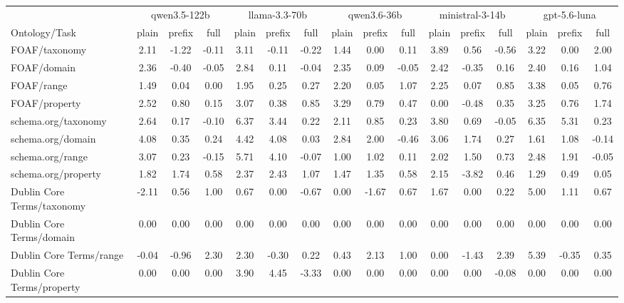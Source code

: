 \begin{tabular}{lccccccccccccccc}
\toprule
 & \multicolumn{3}{c}{qwen3.5-122b} & \multicolumn{3}{c}{llama-3.3-70b} & \multicolumn{3}{c}{qwen3.6-36b} & \multicolumn{3}{c}{ministral-3-14b} & \multicolumn{3}{c}{gpt-5.6-luna} \\
\cmidrule(lr){2-4} \cmidrule(lr){5-7} \cmidrule(lr){8-10} \cmidrule(lr){11-13} \cmidrule(lr){14-16}
Ontology/Task & plain & prefix & full & plain & prefix & full & plain & prefix & full & plain & prefix & full & plain & prefix & full \\
\midrule
FOAF/taxonomy & 2.11 & -1.22 & -0.11 & 3.11 & -0.11 & -0.22 & 1.44 & 0.00 & 0.11 & 3.89 & 0.56 & -0.56 & 3.22 & 0.00 & 2.00 \\
FOAF/domain & 2.36 & -0.40 & -0.05 & 2.84 & 0.11 & -0.04 & 2.35 & 0.09 & -0.05 & 2.42 & -0.35 & 0.16 & 2.40 & 0.16 & 1.04 \\
FOAF/range & 1.49 & 0.04 & 0.00 & 1.95 & 0.25 & 0.27 & 2.20 & 0.05 & 1.07 & 2.25 & 0.07 & 0.85 & 3.38 & 0.05 & 0.76 \\
FOAF/property & 2.52 & 0.80 & 0.15 & 3.07 & 0.38 & 0.85 & 3.29 & 0.79 & 0.47 & 0.00 & -0.48 & 0.35 & 3.25 & 0.76 & 1.74 \\
schema.org/taxonomy & 2.64 & 0.17 & -0.10 & 6.37 & 3.44 & 0.22 & 2.11 & 0.85 & 0.23 & 3.80 & 0.69 & -0.05 & 6.35 & 5.31 & 0.23 \\
schema.org/domain & 4.08 & 0.35 & 0.24 & 4.42 & 4.08 & 0.03 & 2.84 & 2.00 & -0.46 & 3.06 & 1.74 & 0.27 & 1.61 & 1.08 & -0.14 \\
schema.org/range & 3.07 & 0.23 & -0.15 & 5.71 & 4.10 & -0.07 & 1.00 & 1.02 & 0.11 & 2.02 & 1.50 & 0.73 & 2.48 & 1.91 & -0.05 \\
schema.org/property & 1.82 & 1.74 & 0.58 & 2.37 & 2.43 & 1.07 & 1.47 & 1.35 & 0.58 & 2.15 & -3.82 & 0.46 & 1.29 & 0.49 & 0.05 \\
Dublin Core Terms/taxonomy & -2.11 & 0.56 & 1.00 & 0.67 & 0.00 & -0.67 & 0.00 & -1.67 & 0.67 & 1.67 & 0.00 & 0.22 & 5.00 & 1.11 & 0.67 \\
Dublin Core Terms/domain & 0.00 & 0.00 & 0.00 & 0.00 & 0.00 & 0.00 & 0.00 & 0.00 & 0.00 & 0.00 & 0.00 & 0.00 & 0.00 & 0.00 & 0.00 \\
Dublin Core Terms/range & -0.04 & -0.96 & 2.30 & 2.30 & -0.30 & 0.22 & 0.43 & 2.13 & 1.00 & 0.00 & -1.43 & 2.39 & 5.39 & -0.35 & 0.35 \\
Dublin Core Terms/property & 0.00 & 0.00 & 0.00 & 3.90 & 4.45 & -3.33 & 0.00 & 0.00 & 0.00 & 0.00 & 0.00 & -0.08 & 0.00 & 0.00 & 0.00 \\

\end{tabular}
